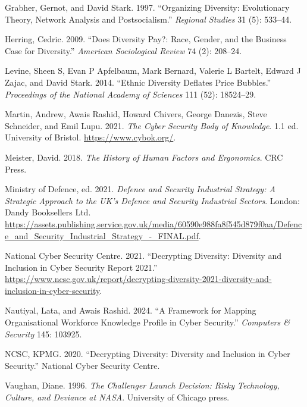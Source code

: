 \documentclass[
  a4paper,
]{book}
\newlength{\cslhangindent}
\newenvironment{CSLReferences}[2] %
 {\begin{list}{}{%
  \setlength{\itemindent}{0pt}
  \setlength{\leftmargin}{0pt}
  \setlength{\parsep}{0pt}
  \ifodd #1
   \setlength{\leftmargin}{\cslhangindent}
   \setlength{\itemindent}{-1\cslhangindent}
  \fi
  \setlength{\itemsep}{#2\baselineskip}}}
 {\end{list}}
\begin{document}
\begin{CSLReferences}{1}{0}
Grabher, Gernot, and David Stark. 1997. {``Organizing Diversity:
Evolutionary Theory, Network Analysis and Postsocialism.''}
\emph{Regional Studies} 31 (5): 533--44.

Herring, Cedric. 2009. {``Does Diversity Pay?: Race, Gender, and the
Business Case for Diversity.''} \emph{American Sociological Review} 74
(2): 208--24.

Levine, Sheen S, Evan P Apfelbaum, Mark Bernard, Valerie L Bartelt,
Edward J Zajac, and David Stark. 2014. {``Ethnic Diversity Deflates
Price Bubbles.''} \emph{Proceedings of the National Academy of Sciences}
111 (52): 18524--29.

Martin, Andrew, Awais Rashid, Howard Chivers, George Danezis, Steve
Schneider, and Emil Lupu. 2021. \emph{The Cyber Security Body of
Knowledge}. 1.1 ed. University of Bristol. \url{https://www.cybok.org/}.

Meister, David. 2018. \emph{The History of Human Factors and
Ergonomics}. CRC Press.

Ministry of Defence, ed. 2021. \emph{Defence and {Security Industrial
Strategy}: {A} Strategic Approach to the {UK}'s Defence and Security
Industrial Sectors}. London: Dandy Booksellers Ltd.
\url{https://assets.publishing.service.gov.uk/media/60590e988fa8f545d879f0aa/Defence_and_Security_Industrial_Strategy_-_FINAL.pdf}.

National Cyber Security Centre. 2021. {``Decrypting Diversity:
{Diversity} and Inclusion in Cyber Security Report 2021.''}
\url{https://www.ncsc.gov.uk/report/decrypting-diversity-2021-diversity-and-inclusion-in-cyber-security}.

Nautiyal, Lata, and Awais Rashid. 2024. {``A Framework for Mapping
Organisational Workforce Knowledge Profile in Cyber Security.''}
\emph{Computers \& Security} 145: 103925.

NCSC, KPMG. 2020. {``Decrypting Diversity: Diversity and Inclusion in
Cyber Security.''} National Cyber Security Centre.

Vaughan, Diane. 1996. \emph{The Challenger Launch Decision: Risky
Technology, Culture, and Deviance at NASA}. University of Chicago press.


\end{CSLReferences}
\end{document}
